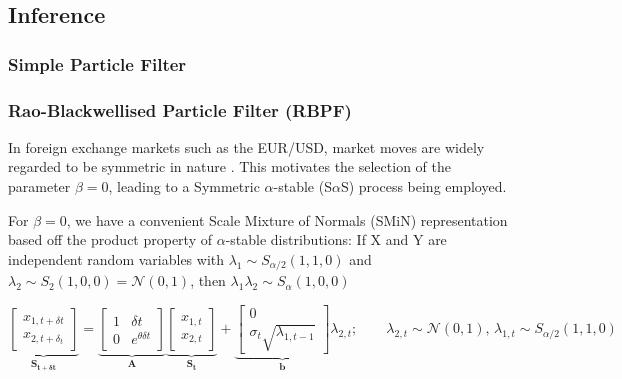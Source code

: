 \documentclass[../main.tex]{subfiles}
\begin{document}
\subsection{Inference}

\subsubsection{Simple Particle Filter}

\subsubsection{Rao-Blackwellised Particle Filter (RBPF)}

In foreign exchange markets such as the EUR/USD, market moves are widely regarded to be symmetric in nature \cite{tankov2003financial}. This motivates the selection of the parameter $\beta = 0$, leading to a Symmetric $\alpha$-stable (S$\alpha$S) process being employed. 

For $\beta = 0$, we have a convenient Scale Mixture of Normals (SMiN) representation based off the product property of $\alpha$-stable distributions: If X and Y are independent random variables with $\lambda_1 \sim S_{\alpha/2}(1, 1, 0)$ and $\lambda_2 \sim S_2(1,0,0) = \mathcal{N}(0,1)$, then $\lambda_1 \lambda_2 \sim S_\alpha(1, 0, 0)$

\begin{equation}
    \underbrace{
        \begin{bmatrix}
        x_{1,t+\delta t} \\ x_{2,t + \delta_t}
        \end{bmatrix}
    }_{\mathbf{S_{t + \delta t}}}
    =
    \underbrace{
        \begin{bmatrix}
        1 & \delta t \\ 0 & e^{\theta \delta t}
        \end{bmatrix}
    }_{\mathbf{A}}
    \underbrace{
        \begin{bmatrix}
        x_{1,t} \\ x_{2,t}
        \end{bmatrix}
    }_{\mathbf{S_t}}
    + 
    \underbrace{
        \begin{bmatrix}
        0 \\ \sigma_t \sqrt{\lambda_{1, t-1}}
        \end{bmatrix}
    }_{\mathbf{b}} \lambda_{2, t};
    \qquad \lambda_{2,t} \sim \mathcal{N}(0,1) \text{,   } \lambda_{1,t} \sim S_{\alpha/2}(1,1,0)
    \label{eqn:RBPF_model}
\end{equation}
\end{document}
